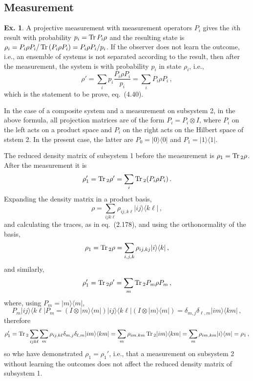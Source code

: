 \documentclass[a4paper,12pt]{article}
\def\Tr{\ensuremath{\mathop{\rm Tr}}{}}
\theoremstyle{definition}
\newtheorem{exercise}{Ex.}[section]
\begin{document}
\subsection{Measurement}\label{ssec:measurement}

\begin{exercise}
 A projective measurement with measurement operators $P_i$ gives the $i$th result with probability $p_i = \Tr P_i\rho$ and the resulting state is $\rho_i = P_i \rho P_i / \Tr (P_i \rho P_i) = P_i \rho P_i /p_i$. If the observer does not learn the outcome, i.e., an ensemble of systems is not separated according to the result, then after the measurement, the system is with probability $p_i$ in state $\rho_i$, i.e.,
 \[
  \rho' = \sum_i p_i \frac{P_i \rho P_i}{p_i} = \sum_i P_i \rho P_i\,,
 \]
 which is the statement to be prove, eq.\ (4.40).

 In the case of a composite system and a measurement on subsystem 2, in the above formula, all projection matrices are of the form $P_i = P_i \otimes I$, where $P_i$ on the left acts on a product space and $P_i$ on the right acts on the Hilbert space of ststem 2. In the present case, the latter are $P_0 = |0\rangle\langle 0|$ and $P_1 = |1\rangle\langle 1|$.
 
 The reduced density matrix of subsystem 1 before the measurement is $\rho_1 = \Tr_2 \rho$. After the measurement it is
 \[
  \rho_1' = \Tr_2 \rho' = \sum_i \Tr_2 (P_i \rho P_i)\,.
 \]
 Expanding the density matrix in a product basis,
 \[
  \rho = \sum_{ijk\ell} \rho_{ij,k\ell} |ij\rangle\langle k\ell|\,,
 \]
 and calculating the traces, as in eq.\ (2.178), and using the orthonormality of the basis,
 \[
  \rho_1 = \Tr_2 \rho = \sum_{i,j,k} \rho_{ij,kj}|i\rangle\langle k|\,,
 \]
 and similarly,
 \[
  \rho_1' = \Tr_2 \rho' = \sum_m \Tr_2 P_m \rho P_m\,,
 \]
 where, using $P_m = |m\rangle\langle m|$,
 \[
  P_m |ij\rangle \langle k\ell| P_m = (I\otimes |m\rangle\langle m|) |ij\rangle \langle k\ell| (I\otimes |m\rangle \langle m|) = \delta_{m,j} \delta_{\ell,m} |im\rangle\langle km|\,,
 \]
 therefore
 \[
  \rho_1' = \Tr_2 \sum_{ijk\ell}\sum_m \rho_{ij,k\ell} \delta_{m,j}\delta_{\ell,m} |im\rangle\langle km| = \sum_m \rho_{im,km} \Tr_2 |im\rangle\langle km| = \sum_m \rho_{im,km}|i\rangle\langle m| = \rho_1\,,
 \]
 so whe have demonstrated $\rho_1=\rho_1'$, i.e., that a measurement on subsystem 2 without learning the outcomes does not affect the reduced density matrix of subsystem 1.
\end{exercise}
\end{document}

